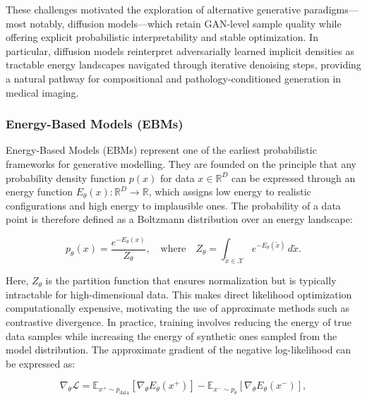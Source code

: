 \vspace{1em}

These challenges motivated the exploration of alternative generative paradigms—most notably, diffusion models—which retain GAN-level sample quality while offering explicit probabilistic interpretability and stable optimization. In particular, diffusion models reinterpret adversarially learned implicit densities as tractable energy landscapes navigated through iterative denoising steps, providing a natural pathway for compositional and pathology-conditioned generation in medical imaging.  

\vspace{2em}
\subsubsection{Energy-Based Models (EBMs)}
Energy-Based Models (EBMs) represent one of the earliest probabilistic frameworks for generative modelling. They are founded on the principle that any probability density function \( p(x) \) for data \( x \in \mathbb{R}^D \) can be expressed through an energy function \( E_\theta(x): \mathbb{R}^D \rightarrow \mathbb{R} \), which assigns low energy to realistic configurations and high energy to implausible ones. The probability of a data point is therefore defined as a Boltzmann distribution over an energy landscape:

\begin{equation}
    p_\theta(x) = \frac{e^{-E_\theta(x)}}{Z_\theta}, \quad \text{where} \quad 
    Z_\theta = \int_{\tilde{x} \in \mathcal{X}} e^{-E_\theta(\tilde{x})} \, d\tilde{x}.
\end{equation}

Here, \( Z_\theta \) is the partition function that ensures normalization but is typically intractable for high-dimensional data. This makes direct likelihood optimization computationally expensive, motivating the use of approximate methods such as contrastive divergence. In practice, training involves reducing the energy of true data samples while increasing the energy of synthetic ones sampled from the model distribution. The approximate gradient of the negative log-likelihood can be expressed as:

\begin{equation}
    \nabla_\theta \mathcal{L} = 
    \mathbb{E}_{x^+ \sim p_{\text{data}}} \left[ \nabla_\theta E_\theta(x^+) \right] -
    \mathbb{E}_{x^- \sim p_\theta} \left[ \nabla_\theta E_\theta(x^-) \right],
\end{equation}

